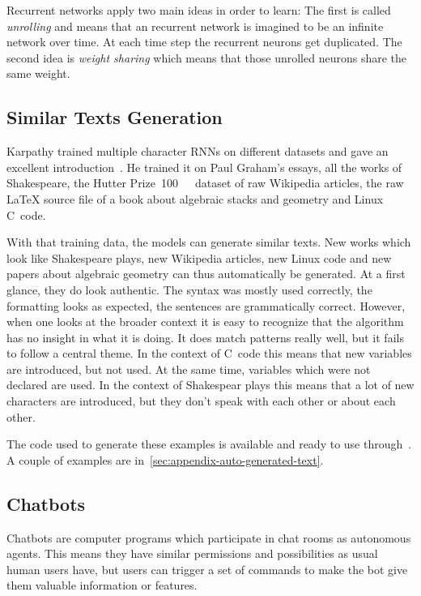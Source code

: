 \documentclass[technote,a4paper,leqno]{IEEEtran}
\begin{document}
Recurrent networks apply two main ideas in order to learn: The first is called
\textit{unrolling} and means that an recurrent network is imagined to be
an infinite network over time. At each time step the recurrent neurons get
duplicated. The second idea is \textit{weight sharing} which means that those
unrolled neurons share the same weight.

\subsection{Similar Texts Generation}
Karpathy trained multiple character \glspl{RNN} on different datasets and gave
an excellent introduction~\cite{Karpathy2015}. He trained it on Paul Graham's
essays, all the works of Shakespeare, the Hutter Prize~\cite{hutterPrize}\SI{100}{\mega\byte}~dataset of raw Wikipedia articles, the raw \LaTeX{} source
file of a book about algebraic stacks and geometry and Linux C~code.

With that training data, the models can generate similar texts. New works which
look like Shakespeare plays, new Wikipedia articles, new Linux code and new
papers about algebraic geometry can thus automatically be generated. At a first
glance, they do look authentic. The syntax was mostly used correctly, the
formatting looks as expected, the sentences are grammatically correct. However,
when one looks at the broader context it is easy to recognize that the
algorithm has no insight in what it is doing. It does match patterns really
well, but it fails to follow a central theme. In the context of C~code this
means that new variables are introduced, but not used. At the same time,
variables which were not declared are used. In the context of Shakespear plays
this means that a lot of new characters are introduced, but they don't speak
with each other or about each other.

The code used to generate these examples is available and ready to use
through~\cite{charRNNgithub}. A couple of examples are
in~\cref{sec:appendix-auto-generated-text}.

\subsection{Chatbots}%

Chatbots are computer programs which participate in chat rooms as autonomous
agents. This means they have similar permissions and possibilities as usual human
users have, but users can trigger a set of commands to make the bot give them
valuable information or features.
\end{document}
